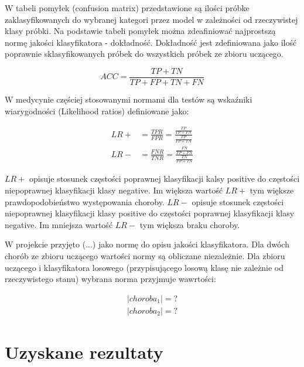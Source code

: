 \documentclass{article}
\begin{document}
W tabeli pomyłek (confusion matrix) przedstawione są ilości próbke zaklasyfikowanych do wybranej kategori przez model w zależności od rzeczywistej klasy próbki. Na podstawie tabeli pomyłek można zdeafiniować najprostszą normę jakości klasyfikatora - dokładność. Dokładność jest zdefiniowana jako ilość poprawnie sklasyfikowanych próbek do wszystkich próbek ze zbioru uczącego.

\begin{equation}
	ACC = \frac{TP+TN}{TP+FP+TN+FN}
\end{equation}

W medycynie częściej stosowanymi normami dla testów są wskaźniki wiarygodności (Likelihood ratios) definiowane jako:

\begin{equation}
\begin{aligned}
	LR+ &= \frac{TPR}{FPR} = \frac{\frac{TP}{TP+FN}}{\frac{FP}{FP+TN}} \\ 
	LR- &= \frac{FNR}{TNR} = \frac{\frac{FN}{TP+FN}}{\frac{TN}{FP+TN}}
\end{aligned}
\end{equation}

$LR+$ opisuje stosunek częstości poprawnej klasyfikacji kalsy positive do częstości niepoprawnej klasyfikacji klasy negative. Im większa wartość $LR+$ tym większe prawdopodobieństwo występowania choroby.
$LR-$ opisuje stosunek częstości niepoprawnej klasyfikacji klasy positive do częstości poprawnej klasyfikacji klasy negative. Im mniejsza wartość $LR-$ tym większa braku choroby.

W projekcie przyjęto (...) jako normę do opisu jakości klasyfikatora.
Dla dwóch chorób ze zbioru uczącego wartości normy są obliczane niezależnie.
Dla zbioru uczącego i klasyfikatora losowego (przypisującego losową klasę nie zależnie od rzeczywistego stanu) wybrana norma przyjmuje wawrtości:

\begin{equation}
\begin{aligned}
  |choroba_1| = ? \\
  |choroba_2| = ?
\end{aligned}
\end{equation}


\section{Uzyskane rezultaty}
\end{document}
